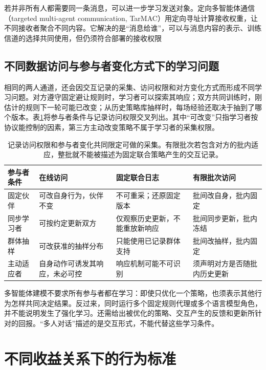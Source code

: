 若并非所有人都需要同一条消息，可以进一步学习发送对象。定向多智能体通信（targeted multi-agent communication, TarMAC）用定向寻址计算接收权重，让不同接收者聚合不同内容。它解决的是“消息给谁”，可以与消息内容的表示、训练信道的选择共同使用，但仍须符合部署的接收权限

\subsection{不同数据访问与参与者变化方式下的学习问题}
\label{sec:rl-multi-agent-access}

相同的两人通道，还会因交互记录的采集、访问权限和对方变化方式而形成不同学习问题。对方遵守固定避让规则时，学习者可以探索其响应；双方共同训练时，刚估计的规则下一轮可能已改变；从历史策略库抽样时，每场经验还取决于抽到了哪个版本。表\ref{tab:rl-multi-agent-access}将参与者条件与记录访问权限交叉列出。其中“可改变”只指学习者按协议能控制的因素，第三方主动改变策略不属于学习者的采集权限。

\begin{table}[htbp]
 \centering
 \begin{tabularx}{\linewidth}{@{}l >{\raggedright\arraybackslash}X >{\raggedright\arraybackslash}X >{\raggedright\arraybackslash}X@{}}
 \toprule
 参与者条件 & 在线访问 & 固定联合日志 & 有限批次访问\\
 \midrule
 固定伙伴 & 可改自身行为，伙伴不变 & 不可重采；还原固定版本 & 批间改自身，批内固定\\
 同步学习者 & 可按约定更新双方 & 仅观察历史更新，不能重放新响应 & 批间同步更新，批内冻结\\
 群体抽样 & 可改获准的抽样分布 & 只能使用已记录群体支持 & 批间改抽样，批内固定\\
 主动适应者 & 自身动作可诱发其响应，未必可控 & 响应机制可能不可识别 & 须声明对方是否随批内历史更新\\
 \bottomrule
 \end{tabularx}
 \caption{记录访问权限和参与者变化共同限定可做的采集。有限批次若包含对方的批内适应，整批就不能被描述为固定联合策略产生的交互记录。}
 \label{tab:rl-multi-agent-access}
\end{table}

多智能体建模不要求所有参与者都在学习：即使只优化一个策略，也须表示其他行为怎样共同决定结果。反过来，同时运行多个固定规则代理或多个语言模型角色，并不能说明发生了强化学习。还需给出被优化的策略、交互产生的反馈和更新所针对的回报。“多人对话”描述的是交互形式，不能代替这些学习条件。

\section{不同收益关系下的行为标准}
\label{sec:rl-multi-agent-solutions}

